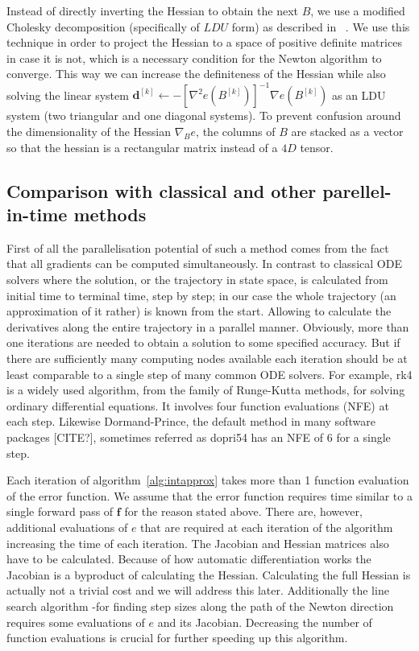 \documentclass{article}
\begin{document}
    Instead of directly inverting the Hessian to obtain the next $B$, we use a modified Cholesky decomposition
    (specifically of $LDU$ form) as described in ~\cite{gill2019practical}.
    We use this technique in order to project the Hessian to a space of positive definite matrices in case it is not,
    which is a necessary condition for the Newton algorithm to converge.
    This way we can increase the definiteness of the Hessian while also solving the linear system
    $\pmb{d}^{[k]} \gets -\left[ \nabla^2 e(B^{[k]}) \right]^{-1} \nabla e(B^{[k]})$ as an LDU system (two triangular
    and one diagonal systems).
    To prevent confusion around the dimensionality of the Hessian $\nabla_{B} e$,
    the columns of $B$ are stacked as a vector so that the hessian is a rectangular matrix instead of a $4D$ tensor.

    \subsection{Comparison with classical and other parellel-in-time methods}
    First of all the parallelisation potential of such a method comes from the fact that all gradients can be computed simultaneously.
    In contrast to classical ODE solvers where the solution, or the trajectory in state space, is calculated from initial time to terminal time, step by step; in our case the whole trajectory (an approximation of it rather) is known from the start.
    Allowing to calculate the derivatives along the entire trajectory in a parallel manner.
    Obviously, more than one iterations are needed to obtain a solution to some specified accuracy.
    But if there are sufficiently many computing nodes available each iteration should be at least comparable to a single step of many common ODE solvers.
    For example, rk4 is a widely used algorithm, from the family of Runge-Kutta methods, for solving ordinary differential equations.
    It involves four function evaluations (NFE) at each step.
    Likewise Dormand-Prince, the default method in many software packages [CITE?], sometimes referred as dopri54 has an NFE of 6 for a single step.

    Each iteration of algorithm~\ref{alg:intapprox} takes more than 1 function evaluation of the error function.
    We assume that the error function requires time similar to a single forward pass of $\pmb{f}$ for the reason stated above.
    There are, however, additional evaluations of $e$ that are required at each iteration of the algorithm increasing the time of each iteration.
    The Jacobian and Hessian matrices also have to be calculated.
    Because of how automatic differentiation works the Jacobian is a byproduct of calculating the Hessian.
    Calculating the full Hessian is actually not a trivial cost and we will address this later.
    Additionally the line search algorithm -for finding step sizes along the path of the Newton direction requires some evaluations of $e$ and its Jacobian.
    Decreasing the number of function evaluations is crucial for further speeding up this algorithm.
\end{document}
